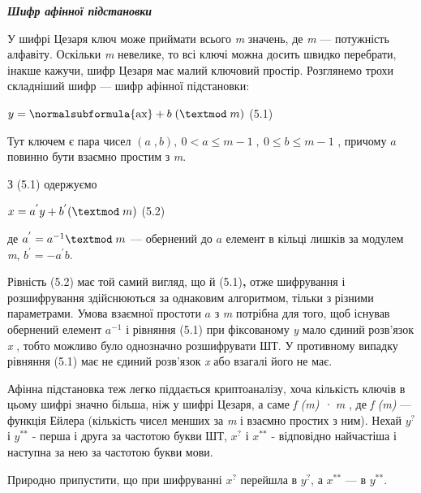 \bigskip


\bigskip


\bigskip

{\centering\bfseries\itshape
Шифр афінної підстановки
\par}


\bigskip


\bigskip

У шифрі Цезаря ключ може приймати всього \textit{m}\textbf{\textit{ }}значень,
де \textit{m }---\textit{ }потужність алфавіту. Оскільки  \textit{m} невелике, то
всі ключі можна досить швидко перебрати, інакше кажучи, шифр Цезаря має малий
ключовий простір. Розглянемо трохи складніший шифр --- шифр афінної підстановки:

{\raggedleft
  $y=\normalsubformula{\text{ax}}+b\;(\textmod\;m)$  (5.1)
\par}

Тут ключем є пара чисел  $(a\;,b),\ 0<a\le m-1\;,\ 0\le b\le m-1$ , причому 
$a$ повинно бути взаємно простим з \textit{m}.

З (5.1)\textbf{ }одержуємо

{\raggedleft
  $x={a}^{'}y+{b}^{'}(\textmod\;m)$  (5.2)
\par}

де  ${a}^{'}=a^{-1}\textmod\;m$ --- обернений до  $a$ елемент в кільці
лишків за модулем \textit{m},   ${b}^{'}=-a^{'}b$.

Рівність (5.2)\textbf{ }має той самий вигляд, що й (5.1)\textbf{, }отже
шифрування і розшифрування здійснюються за однаковим алгоритмом, тільки з
різними параметрами. Умова взаємної простоти  $a$ з \textit{m} потрібна для
того, щоб існував обернений елемент  $a^{-1}$ і рівняння (5.1) при
фіксованому \textit{y} мало єдиний розв’язок  \textit{x} , тобто можливо було
однозначно розшифрувати ШТ. У противному випадку рівняння (5.1) має не єдиний
розв’язок  \textit{x} або взагалі його не має.

Афінна підстановка теж легко піддається криптоаналізу, хоча кількість ключів в
цьому шифрі значно більша, ніж у шифрі Цезаря, а саме 
\textit{\textgreek{f}}\textit{ (m) · }\textit{m} , де
\textit{\textgreek{f}}\textit{ (m)} --- функція Ейлера (кількість чисел менших за
\textit{m} і взаємно простих з ним). Нехай   $y^{?}$ і  $y^{\text{**}}$
- перша і друга за частотою букви ШТ,  $x^{?}$ і  $x^{\text{**}}$ -
відповідно найчастіша і наступна за нею за частотою букви мови.

Природно припустити, що при шифруванні  $x^{?}$ перейшла в  $y^{?}$, а 
$x^{\text{**}}$ --- в  $y^{\text{**}}$.

